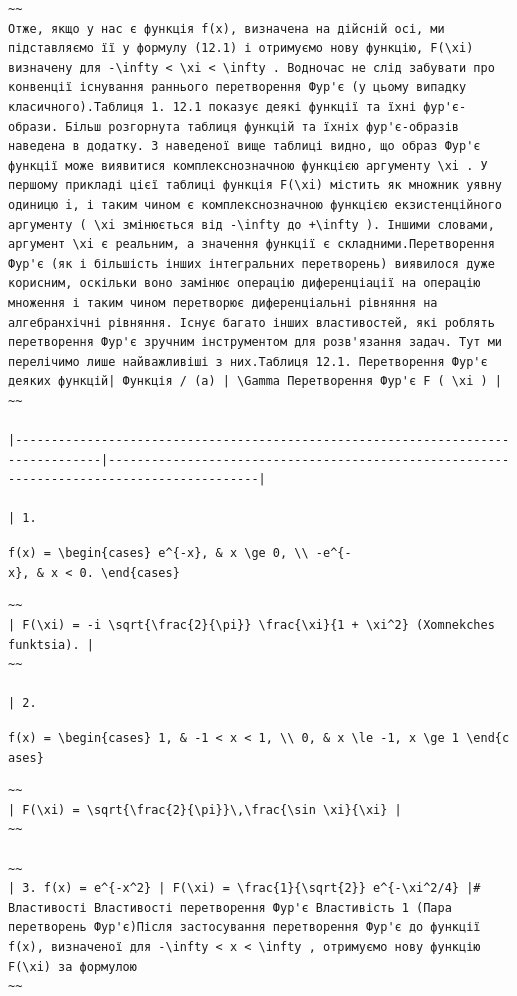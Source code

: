 \documentclass[
  ukrainian,
]{article}
\begin{document}
\begin{verbatim}
~~
Отже, якщо у нас є функція f(x), визначена на дійсній осі, ми підставляємо її у формулу (12.1) і отримуємо нову функцію, F(\xi) визначену для -\infty < \xi < \infty . Водночас не слід забувати про конвенції існування раннього перетворення Фур'є (у цьому випадку класичного).Таблиця 1. 12.1 показує деякі функції та їхні фур'є-образи. Більш розгорнута таблиця функцій та їхніх фур'є-образів наведена в додатку. З наведеної вище таблиці видно, що образ Фур'є функції може виявитися комплекснозначною функцією аргументу \xi . У першому прикладі цієї таблиці функція F(\xi) містить як множник уявну одиницю i, і таким чином є комплекснозначною функцією екзистенційного аргументу ( \xi змінюється від -\infty до +\infty ). Іншими словами, аргумент \xi є реальним, а значення функції є складними.Перетворення Фур'є (як і більшість інших інтегральних перетворень) виявилося дуже корисним, оскільки воно замінює операцію диференціації на операцію множення і таким чином перетворює диференціальні рівняння на алгебранхічні рівняння. Існує багато інших властивостей, які роблять перетворення Фур'є зручним інструментом для розв'язання задач. Тут ми перелічимо лише найважливіші з них.Таблиця 12.1. Перетворення Фур'є деяких функцій| Функція / (a) | \Gamma Перетворення Фур'є F ( \xi ) |
~~

|----------------------------------------------------------------------------------|-------------------------------------------------------------------------------------------|

| 1.
\end{verbatim}

\texttt{f(x)\ =\ \textbackslash{}begin\{cases\}\ e\^{}\{-x\},\ \&\ x\ \textbackslash{}ge\ 0,\ \textbackslash{}\textbackslash{}\ -e\^{}\{-x\},\ \&\ x\ \textless{}\ 0.\ \textbackslash{}end\{cases\}}

\begin{verbatim}
~~
| F(\xi) = -i \sqrt{\frac{2}{\pi}} \frac{\xi}{1 + \xi^2} (Xomnekches funktsia). |
~~

| 2.
\end{verbatim}

\texttt{f(x)\ =\ \textbackslash{}begin\{cases\}\ 1,\ \&\ -1\ \textless{}\ x\ \textless{}\ 1,\ \textbackslash{}\textbackslash{}\ 0,\ \&\ x\ \textbackslash{}le\ -1,\ x\ \textbackslash{}ge\ 1\ \textbackslash{}end\{cases\}}

\begin{verbatim}
~~
| F(\xi) = \sqrt{\frac{2}{\pi}}\,\frac{\sin \xi}{\xi} |
~~

~~
| 3. f(x) = e^{-x^2} | F(\xi) = \frac{1}{\sqrt{2}} e^{-\xi^2/4} |# Властивості Властивості перетворення Фур'є Властивість 1 (Пара перетворень Фур'є)Після застосування перетворення Фур'є до функції f(x), визначеної для -\infty < x < \infty , отримуємо нову функцію F(\xi) за формулою
~~
\end{verbatim}
\end{document}
